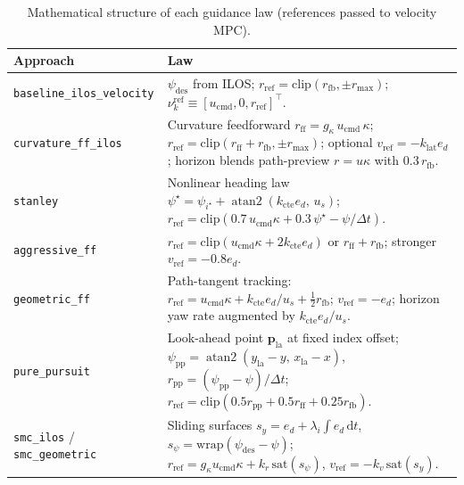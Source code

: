 \documentclass[11pt,a4paper]{article}
\begin{document}
\begin{table}[H]
  \centering
  \caption{Mathematical structure of each guidance law (references passed to velocity MPC).}
  \label{tab:theory}
  \footnotesize
  \begin{tabular}{@{}p{2.1cm}p{10.8cm}@{}}
    \toprule
    Approach & Law \\
    \midrule
    \texttt{baseline\_ilos\_velocity}
    & $\psi_{\mathrm{des}}$ from ILOS; $r_{\mathrm{ref}}=\mathrm{clip}(r_{\mathrm{fb}},\pm r_{\max})$;
      $\nu^{\mathrm{ref}}_k \equiv [u_{\mathrm{cmd}},0,r_{\mathrm{ref}}]^\top$. \\
    \midrule
    \texttt{curvature\_ff\_ilos}
    & Curvature feedforward $r_{\mathrm{ff}} = g_\kappa\, u_{\mathrm{cmd}}\,\kappa$;
      $r_{\mathrm{ref}}=\mathrm{clip}(r_{\mathrm{ff}}+r_{\mathrm{fb}},\pm r_{\max})$;
      optional $v_{\mathrm{ref}}=-k_{\mathrm{lat}} e_d$;
      horizon blends path-preview $r=u\kappa$ with $0.3\, r_{\mathrm{fb}}$. \\
    \midrule
    \texttt{stanley}
    & Nonlinear heading law
      $\psi^\star = \psi_{i^\star} + \operatorname{atan2}(k_{\mathrm{cte}} e_d,\, u_s)$;
      $r_{\mathrm{ref}} = \mathrm{clip}(0.7\, u_{\mathrm{cmd}}\kappa + 0.3\,\psi^\star-\psi/\Delta t)$. \\
    \midrule
    \texttt{aggressive\_ff}
    & $r_{\mathrm{ref}} = \mathrm{clip}(u_{\mathrm{cmd}}\kappa + 2 k_{\mathrm{cte}} e_d)$ or
      $r_{\mathrm{ff}}+r_{\mathrm{fb}}$; stronger $v_{\mathrm{ref}}=-0.8 e_d$. \\
    \midrule
    \texttt{geometric\_ff}
    & Path-tangent tracking: $r_{\mathrm{ref}} = u_{\mathrm{cmd}}\kappa
      + k_{\mathrm{cte}} e_d/u_s + \tfrac{1}{2} r_{\mathrm{fb}}$;
      $v_{\mathrm{ref}}=-e_d$; horizon yaw rate augmented by $k_{\mathrm{cte}} e_d/u_s$. \\
    \midrule
    \texttt{pure\_pursuit}
    & Look-ahead point $\mathbf{p}_{\mathrm{la}}$ at fixed index offset;
      $\psi_{\mathrm{pp}}=\operatorname{atan2}(y_{\mathrm{la}}-y,\, x_{\mathrm{la}}-x)$,
      $r_{\mathrm{pp}}=(\psi_{\mathrm{pp}}-\psi)/\Delta t$;
      $r_{\mathrm{ref}}=\mathrm{clip}(0.5 r_{\mathrm{pp}} + 0.5 r_{\mathrm{ff}} + 0.25 r_{\mathrm{fb}})$. \\
    \midrule
    \texttt{smc\_ilos} /
    \texttt{smc\_geometric}
    & Sliding surfaces $s_y = e_d + \lambda_i \!\int\! e_d\,\mathrm{d}t$,
      $s_\psi = \mathrm{wrap}(\psi_{\mathrm{des}}-\psi)$;
      $r_{\mathrm{ref}} = g_\kappa u_{\mathrm{cmd}}\kappa + k_r\,\mathrm{sat}(s_\psi)$,
      $v_{\mathrm{ref}} = -k_v\,\mathrm{sat}(s_y)$.

\end{tabular}
\end{table}
\end{document}
